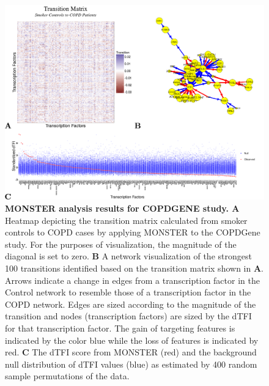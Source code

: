 \begin{figure}
\includegraphics[width=1\linewidth]{figures/figure2COPDGene}
\caption[MONSTER analysis results for COPDGENE study]{\textbf{MONSTER analysis results for COPDGENE study. A } Heatmap depicting the transition matrix calculated from smoker controls to COPD cases by applying MONSTER to the COPDGene study. For the purposes of visualization, the magnitude of the diagonal is set to zero. \textbf{B} A network visualization of the strongest 100 transitions identified based on the transition matrix shown in \textbf{A}. Arrows indicate a change in edges from a transcription factor in the Control network to resemble those of a transcription factor in the COPD network. Edges are sized according to the magnitude of the transition and nodes (transcription factors) are sized by the dTFI for that transcription factor. The gain of targeting features is indicated by the color blue while the loss of features is indicated by red. \textbf{C} The dTFI score from MONSTER (red) and the background null distribution of dTFI values (blue) as estimated by 400 random sample permutations of the data.}
\label{fig:figure2COPDGene}
\end{figure}

